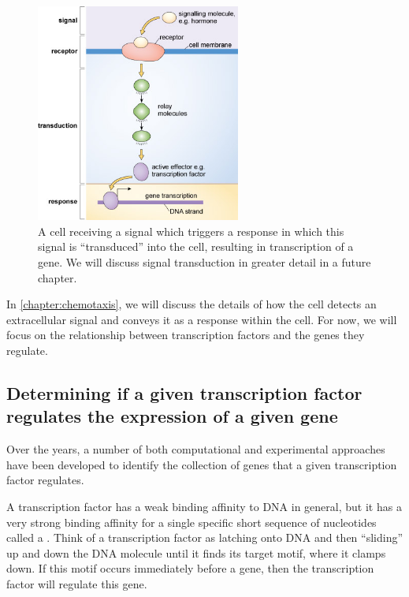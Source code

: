 \begin{figure}[h]
\centering
\mySfFamily
\includegraphics[width = 0.6\textwidth]{../images/signal_pathway.jpg}
\caption{A cell receiving a signal which triggers a response in which this signal is ``transduced'' into the cell, resulting in transcription of a gene. We will discuss signal transduction in greater detail in a future chapter.}
\label{fig:transduction}
\end{figure}

In \autoref{chapter:chemotaxis}, we will discuss the details of how the cell detects an extracellular signal and conveys it as a response within the cell. For now, we will focus on the relationship between transcription factors and the genes they regulate.

\subsection{Determining if a given transcription factor regulates the expression of a given gene}

Over the years, a number of both computational and experimental approaches have been developed to identify the collection of genes that a given transcription factor regulates.

A transcription factor has a weak binding affinity to DNA in general, but it has a very strong binding affinity for a single specific short sequence of nucleotides called a . Think of a transcription factor as latching onto DNA and then ``sliding'' up and down the DNA molecule until it finds its target motif, where it clamps down. If this motif occurs immediately before a gene, then the transcription factor will regulate this gene.\\

